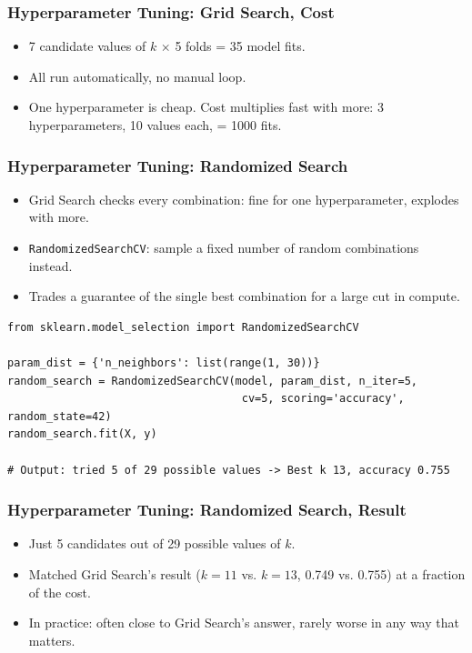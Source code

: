 \begin{frame}[fragile]\frametitle{Hyperparameter Tuning: Grid Search, Cost}
\begin{itemize}
\item 7 candidate values of $k$ $\times$ 5 folds = 35 model fits.
\item All run automatically, no manual loop.
\item One hyperparameter is cheap. Cost multiplies fast with more: 3 hyperparameters, 10 values each, = 1000 fits.
\end{itemize}
\end{frame}

\begin{frame}[fragile]\frametitle{Hyperparameter Tuning: Randomized Search}
\begin{itemize}
\item Grid Search checks every combination: fine for one hyperparameter, explodes with more.
\item \texttt{RandomizedSearchCV}: sample a fixed number of random combinations instead.
\item Trades a guarantee of the single best combination for a large cut in compute.
\end{itemize}

\begin{lstlisting}
from sklearn.model_selection import RandomizedSearchCV

param_dist = {'n_neighbors': list(range(1, 30))}
random_search = RandomizedSearchCV(model, param_dist, n_iter=5,
                                    cv=5, scoring='accuracy', random_state=42)
random_search.fit(X, y)

# Output: tried 5 of 29 possible values -> Best k 13, accuracy 0.755
\end{lstlisting}
\end{frame}

\begin{frame}[fragile]\frametitle{Hyperparameter Tuning: Randomized Search, Result}
\begin{itemize}
\item Just 5 candidates out of 29 possible values of $k$.
\item Matched Grid Search's result ($k=11$ vs. $k=13$, 0.749 vs. 0.755) at a fraction of the cost.
\item In practice: often close to Grid Search's answer, rarely worse in any way that matters.
\end{itemize}
\end{frame}

